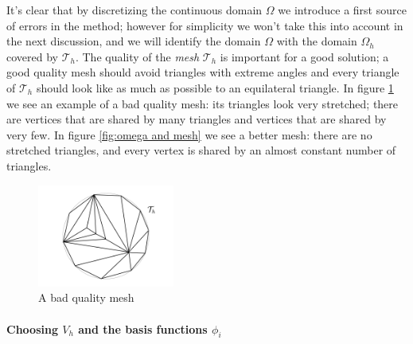 It's clear that by discretizing the continuous domain $\Omega$ we introduce a first source of errors in the method; however for simplicity we won't take this into account in the next discussion, and we will identify the domain $\Omega$ with the domain $\Omega_h$ covered by $\mathcal T_h$. The quality of the \textit{mesh} $\mathcal T_h$ is important for a good solution; a good quality mesh should avoid triangles with extreme angles and every triangle of $\mathcal T_h$ should look like as much as possible to an equilateral triangle. In figure \ref{fig:bad mesh} we see an example of a bad quality mesh: its triangles look very stretched; there are vertices that are shared by many triangles and vertices that are shared by very few. In figure \ref{fig:omega and mesh} we see a better mesh: there are no stretched triangles, and every vertex is shared by an almost constant number of triangles.
\begin{figure}
	\begin{center}
		\includegraphics[width=0.4\textwidth]{figs/Chapter3/badmesh.png}
		\caption{\label{fig:bad mesh}A bad quality mesh}
	\end{center}
	
\end{figure}
\paragraph{Choosing $V_h$ and the basis functions $\phi_i$}

